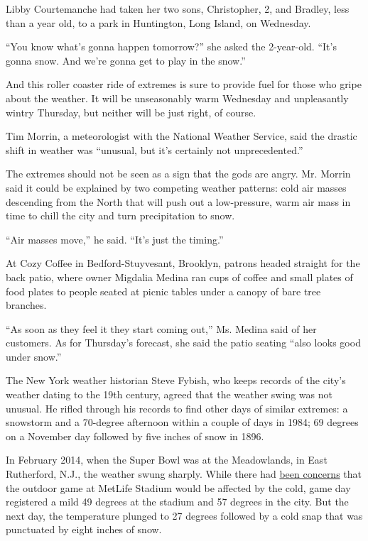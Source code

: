 Libby Courtemanche had taken her two sons, Christopher, 2, and Bradley,
less than a year old, to a park in Huntington, Long Island, on
Wednesday.

``You know what's gonna happen tomorrow?'' she asked the 2-year-old.
``It's gonna snow. And we're gonna get to play in the snow.''

And this roller coaster ride of extremes is sure to provide fuel for
those who gripe about the weather. It will be unseasonably warm
Wednesday and unpleasantly wintry Thursday, but neither will be just
right, of course.

Tim Morrin, a meteorologist with the National Weather Service, said the
drastic shift in weather was ``unusual, but it's certainly not
unprecedented.''

The extremes should not be seen as a sign that the gods are angry. Mr.
Morrin said it could be explained by two competing weather patterns:
cold air masses descending from the North that will push out a
low-pressure, warm air mass in time to chill the city and turn
precipitation to snow.

``Air masses move,'' he said. ``It's just the timing.''

At Cozy Coffee in Bedford-Stuyvesant, Brooklyn, patrons headed straight
for the back patio, where owner Migdalia Medina ran cups of coffee and
small plates of food plates to people seated at picnic tables under a
canopy of bare tree branches.

``As soon as they feel it they start coming out,'' Ms. Medina said of
her customers. As for Thursday's forecast, she said the patio seating
``also looks good under snow.''

The New York weather historian Steve Fybish, who keeps records of the
city's weather dating to the 19th century, agreed that the weather swing
was not unusual. He rifled through his records to find other days of
similar extremes: a snowstorm and a 70-degree afternoon within a couple
of days in 1984; 69 degrees on a November day followed by five inches of
snow in 1896.

In February 2014, when the Super Bowl was at the Meadowlands, in East
Rutherford, N.J., the weather swung sharply. While there had
\href{https://www.nytimes.com/2014/02/03/sports/football/not-quite-75-and-sunny-but-a-mild-day-dispels-the-weather-worries.html}{been
concerns} that the outdoor game at MetLife Stadium would be affected by
the cold, game day registered a mild 49 degrees at the stadium and 57
degrees in the city. But the next day, the temperature plunged to 27
degrees followed by a cold snap that was punctuated by eight inches of
snow.

